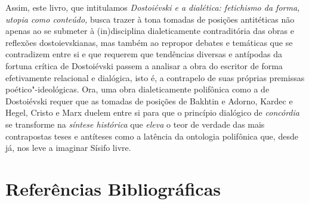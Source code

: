 Assim, este livro, que intitulamos \emph{Dostoiévski e a dialética:
fetichismo da forma, utopia como conteúdo,} busca trazer à tona tomadas
de posições antitéticas não apenas ao se submeter à (in)disciplina
dialeticamente contraditória das obras e reflexões dostoievskianas, mas
também ao repropor debates e temáticas que se contradizem entre si e que
requerem que tendências diversas e antípodas da fortuna crítica de
Dostoiévski passem a analisar a obra do escritor de forma efetivamente
relacional e dialógica, isto é, a contrapelo de suas próprias premissas
poético"-ideológicas. Ora, uma obra dialeticamente polifônica como a de
Dostoiévski requer que as tomadas de posições de Bakhtin e Adorno,
Kardec e Hegel, Cristo e Marx duelem entre si para que o princípio
dialógico de \emph{concórdia} se transforme na \emph{síntese histórica}
que \emph{eleva} o teor de verdade das mais contrapostas teses e
antíteses como a latência da ontologia polifônica que, desde já, nos
leve a imaginar Sísifo livre.

\chapter*{Referências Bibliográficas}



